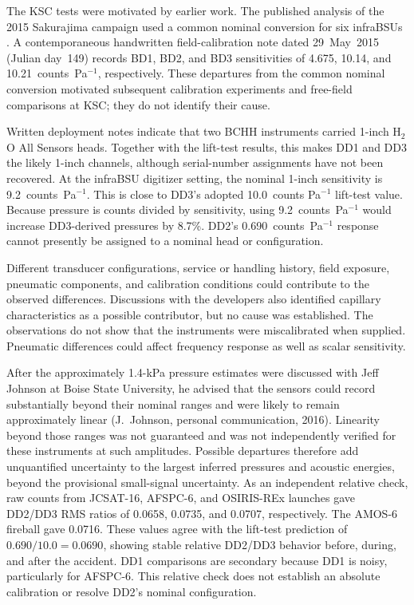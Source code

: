 \documentclass[]{seismica}
\begin{document}
The KSC tests were motivated by earlier work. The published analysis of the
2015 Sakurajima campaign used a common nominal conversion for six infraBSUs
\citep{smith_sakurajima_2020}. A contemporaneous handwritten field-calibration
note dated 29~May~2015 (Julian day~149) records BD1, BD2, and BD3 sensitivities
of 4.675, 10.14, and 10.21~counts~Pa$^{-1}$, respectively. These departures
from the common nominal conversion motivated subsequent calibration
experiments and free-field comparisons at KSC; they do not identify their cause.

Written deployment notes indicate that two BCHH instruments carried 1-inch
H$_2$O All Sensors heads. Together with the lift-test results, this makes DD1
and DD3 the likely 1-inch channels, although serial-number assignments have
not been recovered. At the infraBSU digitizer setting, the nominal 1-inch
sensitivity is 9.2~counts~Pa$^{-1}$. This is close to DD3's adopted 10.0~counts
Pa$^{-1}$ lift-test value. Because pressure is counts divided by sensitivity,
using 9.2~counts~Pa$^{-1}$ would increase DD3-derived pressures by 8.7\%.
DD2's 0.690~counts~Pa$^{-1}$ response cannot presently be assigned to a nominal
head or configuration.

Different transducer configurations, service or handling history, field
exposure, pneumatic components, and calibration conditions could contribute to
the observed differences. Discussions with the developers also identified
capillary characteristics as a possible contributor, but no cause was
established. The observations do not show that the instruments were
miscalibrated when supplied. Pneumatic differences could affect frequency
response as well as scalar sensitivity.

After the approximately 1.4-kPa pressure estimates were discussed with Jeff
Johnson at Boise State University, he advised that the sensors could record
substantially beyond their nominal ranges and were likely to remain
approximately linear (J.~Johnson, personal communication, 2016). Linearity
beyond those ranges was not guaranteed and was not independently verified
for these instruments at such amplitudes. Possible departures therefore add
unquantified uncertainty to the largest inferred pressures and acoustic
energies, beyond the provisional small-signal uncertainty. As an independent
relative check, raw counts from JCSAT-16, AFSPC-6, and OSIRIS-REx launches
gave DD2/DD3 RMS ratios of 0.0658, 0.0735, and 0.0707, respectively. The
AMOS-6 fireball gave 0.0716. These values agree with the lift-test prediction
of $0.690/10.0=0.0690$, showing stable relative DD2/DD3 behavior before,
during, and after the accident. DD1 comparisons are secondary because DD1 is
noisy, particularly for AFSPC-6. This relative check does not establish an
absolute calibration or resolve DD2's nominal configuration.
\end{document}
